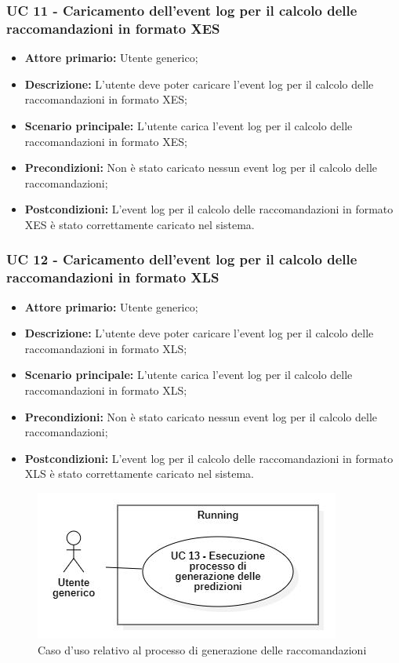 \subsubsection{UC 11 - Caricamento dell'event log per il calcolo delle raccomandazioni in formato XES}
\begin{itemize}
	\item \textbf{Attore primario:} Utente generico;
	\item \textbf{Descrizione:} L'utente deve poter caricare l'event log per il calcolo delle raccomandazioni in formato XES;
	\item \textbf{Scenario principale:} L'utente carica l'event log per il calcolo delle raccomandazioni in formato XES;
	\item \textbf{Precondizioni:} Non è stato caricato nessun event log per il calcolo delle raccomandazioni;
	\item \textbf{Postcondizioni:} L'event log per il calcolo delle raccomandazioni in formato XES è stato correttamente caricato nel sistema.
\end{itemize}

\subsubsection{UC 12 - Caricamento dell'event log per il calcolo delle raccomandazioni in formato XLS}
\begin{itemize}
	\item \textbf{Attore primario:} Utente generico;
	\item \textbf{Descrizione:} L'utente deve poter caricare l'event log per il calcolo delle raccomandazioni in formato XLS;
	\item \textbf{Scenario principale:} L'utente carica l'event log per il calcolo delle raccomandazioni in formato XLS;
	\item \textbf{Precondizioni:} Non è stato caricato nessun event log per il calcolo delle raccomandazioni;
	\item \textbf{Postcondizioni:} L'event log per il calcolo delle raccomandazioni in formato XLS è stato correttamente caricato nel sistema.
\end{itemize}

\begin{figure}[H]
    \centering
    \includegraphics[scale=0.6]{immagini/usecase/cd7.JPG}
    \caption{Caso d'uso relativo al processo di generazione delle raccomandazioni}
\end{figure}

